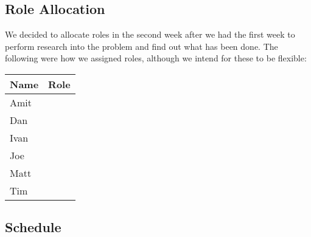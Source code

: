 \subsection{Role Allocation}

We decided to allocate roles in the second week after we had the first week to perform research into the problem and find out what has been done. The following were how we assigned roles, although we intend for these to be flexible:

\begin{table}[H]
	\centering
	\begin{tabular}{| l | l |}
	Name & Role \\
	\hline
	Amit & ~ \\
	Dan & ~ \\
	Ivan & ~ \\
	Joe & ~ \\
	Matt & ~ \\
	Tim & ~ \\
	\end{tabular}
\end{table}


\subsection{Schedule}



